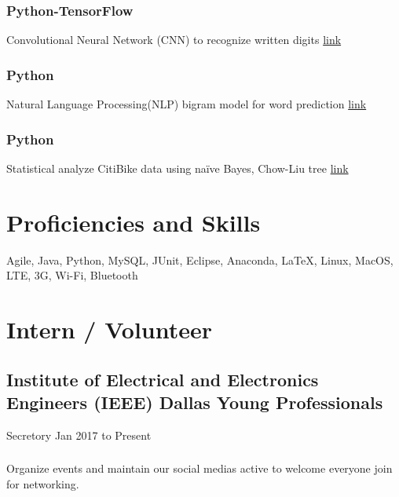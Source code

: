 \documentclass[letterpaper,11pt]{article}
\begin{document}
\subsubsection{Python-TensorFlow} Convolutional Neural Network (CNN) to recognize written digits 
\href{https://github.com/fatliau/MNIST_cnn}{\hfill link} 
\subsubsection{Python} Natural Language Processing(NLP) bigram model for word prediction 
\href{https://github.com/fatliau/NLP_bigram}{\hfill link} 
\subsubsection{Python} Statistical analyze CitiBike data using naïve Bayes, Chow-Liu tree
\href{https://github.com/fatliau/CitiBike_DataAnalysis}{\hfill link}
\section{Proficiencies and Skills}
Agile, Java, Python, MySQL, JUnit, Eclipse, Anaconda, LaTeX, Linux, MacOS, LTE, 3G, Wi-Fi, Bluetooth
\section{Intern / Volunteer}
\subsection{Institute of Electrical and Electronics Engineers (IEEE) Dallas Young Professionals}
Secretory \hfill\small\normalfont Jan 2017 to Present
\subsubsection{}Organize events and maintain our social medias active to welcome everyone join for networking.

\end{document}
